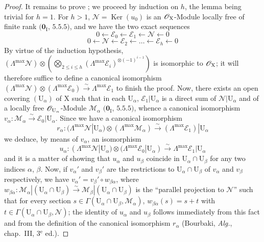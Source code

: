 \begin{proof}
It remains to prove ; we proceed by induction on $h$, the lemma being trivial for $h=1$.
For $h>1$, $\mathscr{N}=\operatorname{Ker}(u_0)$ is an $\mathscr{O}_{\mathrm{X}}$-Module locally free of finite rank $(\mathbf{0}_{\mathrm{I}}$, $5.5.5)$, and we have the two exact sequences
\[
  0\leftarrow\mathscr{E}_0\leftarrow\mathscr{E}_1\leftarrow\mathscr{N}\leftarrow 0
\]
\[
  0\leftarrow\mathscr{N}\leftarrow\mathscr{E}_2\leftarrow\ldots\leftarrow\mathscr{E}_h\leftarrow 0
\]
By virtue of the induction hypothesis, $(\Lambda^{\max}\mathscr{N})\otimes(\bigotimes_{2\leq i\leq h}(\Lambda^{\max}\mathscr{E}_i)^{\otimes(-1)^{i-1}})$ is isomorphic to $\mathscr{O}_{\mathrm{X}}$; it will therefore suffice to define a canonical isomorphism $(\Lambda^{\max}\mathscr{N})\otimes(\Lambda^{\max}\mathscr{E}_0)\xrightarrow{\sim}\Lambda^{\max}\mathscr{E}_1$ to finish the proof.
Now, there exists an open covering $(\mathrm{U}_\alpha)$ of $\mathrm{X}$ such that in each $\mathrm{U}_\alpha$, $\mathscr{E}_1|\mathrm{U}_\alpha$ is a direct sum of $\mathscr{N}|\mathrm{U}_\alpha$ and of a locally free $\mathscr{O}_{\mathrm{U}_\alpha}$-Module $\mathscr{M}_\alpha$ $(\mathbf{0}_{\mathrm{I}}$, $5.5.5)$, whence a canonical isomorphism $v_\alpha:\mathscr{M}_\alpha\xrightarrow{\sim}\mathscr{E}_0|\mathrm{U}_\alpha$.
Since we have a canonical isomorphism
\[
  r_\alpha:(\Lambda^{\max}\mathscr{N}|\mathrm{U}_\alpha)\otimes(\Lambda^{\max}\mathscr{M}_\alpha)\xrightarrow{\sim}(\Lambda^{\max}\mathscr{E}_1)|\mathrm{U}_\alpha
\]
we deduce, by means of $v_\alpha$, an isomorphism
\[
  u_\alpha:(\Lambda^{\max}\mathscr{N}|\mathrm{U}_\alpha)\otimes(\Lambda^{\max}\mathscr{E}_0|\mathrm{U}_\alpha)\xrightarrow{\sim}\Lambda^{\max}\mathscr{E}_1|\mathrm{U}_\alpha
\]
and it is a matter of showing that $u_\alpha$ and $u_\beta$ coincide in $\mathrm{U}_\alpha\cap\mathrm{U}_\beta$ for any two indices $\alpha$, $\beta$.
Now, if $v_\alpha'$ and $v_\beta'$ are the restrictions to $\mathrm{U}_\alpha\cap\mathrm{U}_\beta$ of $v_\alpha$ and $v_\beta$ respectively, we have $v_\alpha'=v_\beta'\circ w_{\beta\alpha}$, where $w_{\beta\alpha}:\mathscr{M}_\alpha|(\mathrm{U}_\alpha\cap\mathrm{U}_\beta)\xrightarrow{\sim}\mathscr{M}_\beta|(\mathrm{U}_\alpha\cap\mathrm{U}_\beta)$ is the ``parallel projection to $\mathscr{N}$'' such that for every section $s\in\Gamma(\mathrm{U}_\alpha\cap\mathrm{U}_\beta,\mathscr{M}_\alpha)$, $w_{\beta\alpha}(s)=s+t$ with $t\in\Gamma(\mathrm{U}_\alpha\cap\mathrm{U}_\beta,\mathscr{N})$; the identity of $u_\alpha$ and $u_\beta$ follows immediately from this fact and from the definition of the canonical isomorphism $r_\alpha$ (Bourbaki, \emph{Alg.}, chap.~III, 3$^{\text{e}}$ ed.).
\end{proof}

